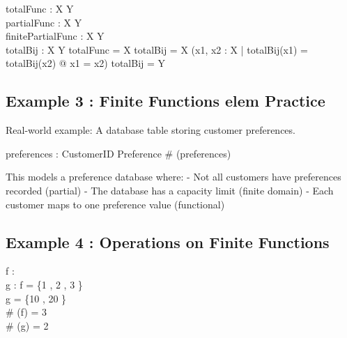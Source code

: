 \documentclass[a4paper,10pt,fleqn]{article}
\begin{document}
\bigskip

\begin{zed}
[X, Y]
\end{zed}

\begin{axdef}
totalFunc : X \fun Y \\
partialFunc : X \pfun Y \\
finitePartialFunc : X \ffun Y \\
totalBij : X \bij Y
\where
\dom totalFunc = X \land \dom totalBij = X \land (\forall x1, x2 : X | totalBij(x1) = totalBij(x2) @ x1 = x2) \land \ran totalBij = Y
\end{axdef}

\subsection*{Example 3 : Finite Functions elem Practice}

\noindent Real-world example: A database table storing customer preferences.

\bigskip

\begin{zed}
\end{zed}

\begin{axdef}
preferences : CustomerID \ffun Preference
\where
\# (\dom preferences) 
\end{axdef}

\noindent This models a preference database where: - Not all customers have preferences recorded (partial) - The database has a capacity limit (finite domain) - Each customer maps to one preference value (functional)

\bigskip

\subsection*{Example 4 : Operations on Finite Functions}

\begin{axdef}
f : \nat \ffun \nat \\
g : \nat \ffun \nat
\where
f = \{1 , 2 , 3 \} \land \\
\quad g = \{10 , 20 \} \land \\
\quad \# (\dom f) = 3 \land \\
\quad \# (\dom g) = 2
\end{axdef}
\end{document}
